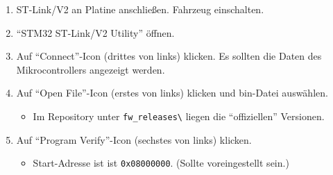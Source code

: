\begin{enumerate}
	\item ST-Link/V2 an Platine anschließen. Fahrzeug einschalten.
	\item "`STM32 ST-Link/V2 Utility"' öffnen.
	\item Auf "`Connect"'-Icon (drittes von links) klicken. Es sollten die Daten des Mikrocontrollers angezeigt werden.
	\item Auf "`Open File"'-Icon (erstes von links) klicken und bin-Datei auswählen.
		\begin{itemize}
			\item Im Repository unter \verb|fw_releases\| liegen die "`offiziellen"' Versionen.
		\end{itemize}
	\item Auf "`Program Verify"'-Icon (sechstes von links) klicken.
		\begin{itemize}
			\item Start-Adresse ist ist \verb|0x08000000|. (Sollte voreingestellt sein.)
		\end{itemize}
\end{enumerate}



